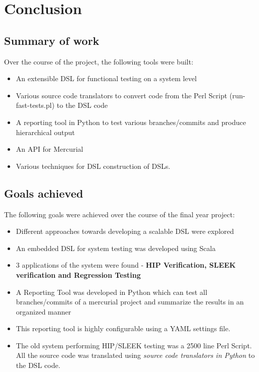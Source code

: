 \documentclass[12pt]{article}
\begin{document}
\section{Conclusion}
\subsection{Summary of work}
Over the course of the project, the following tools were built:
\begin{itemize}
\item An extensible DSL for functional testing on a system level
\item Various source code translators to convert code from the Perl Script (run-fast-tests.pl) to the DSL code
\item A reporting tool in Python to test various branches/commits and produce hierarchical output
\item An API for Mercurial
\item Various techniques for DSL construction of DSLs.
\end{itemize}
\subsection{Goals achieved}
The following goals were achieved over the course of the final year project:
\begin{itemize}
\item Different approaches towards developing a scalable DSL were explored
\item An embedded DSL for system testing was developed using Scala
\item 3 applications of the system were found - \textbf{HIP Verification, SLEEK verification and Regression Testing}
\item A Reporting Tool was developed in Python which can test all branches/commits of a mercurial project and summarize the results in an organized manner
\item This reporting tool is highly configurable using a YAML settings file.
\item The old system performing HIP/SLEEK testing was a 2500 line Perl Script. All the source code was translated using \textit{source code translators in Python} to the DSL code.
\end{itemize}
\end{document}
